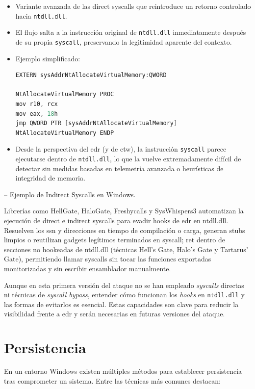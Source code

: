 \begin{itemize}
\item Variante avanzada de las direct syscalls que reintroduce un retorno controlado hacia \texttt{ntdll.dll}.
\item El flujo salta a la instrucción original de \texttt{ntdll.dll} inmediatamente después de su propia \texttt{syscall}, preservando la legitimidad aparente del contexto.
\item Ejemplo simplificado:
\begin{lstlisting}[language=C]
EXTERN sysAddrNtAllocateVirtualMemory:QWORD

NtAllocateVirtualMemory PROC
mov r10, rcx
mov eax, 18h
jmp QWORD PTR [sysAddrNtAllocateVirtualMemory]
NtAllocateVirtualMemory ENDP
\end{lstlisting}
\item Desde la perspectiva del \acrshort{edr} (y de \acrshort{etw}), la instrucción \texttt{syscall} parece ejecutarse dentro de \texttt{ntdll.dll}, lo que la vuelve extremadamente difícil de detectar sin medidas basadas en telemetría avanzada o heurísticas de integridad de memoria.
\end{itemize}

\cite{ref:indirectsyscalls} – Ejemplo de Indirect Syscalls en Windows.

Librerías como HellGate, HaloGate, Freshycalls y SysWhispers3 automatizan la ejecución de direct e indirect syscalls para evadir hooks de \acrshort{edr} en ntdll.dll. Resuelven los \acrshort{ssn} y direcciones en tiempo de compilación o carga, generan stubs limpios o reutilizan gadgets legítimos terminados en syscall; ret dentro de secciones no hookeadas de ntdll.dll (técnicas Hell’s Gate, Halo’s Gate y Tartarus’ Gate), permitiendo llamar syscalls sin tocar las funciones exportadas monitorizadas y sin escribir ensamblador manualmente.

Aunque en esta primera versión del ataque no se han empleado \textit{syscalls} directas ni técnicas de \textit{syscall bypass}, entender cómo funcionan los \textit{hooks} en \texttt{ntdll.dll} y las formas de evitarlos es esencial. Estas capacidades son clave para reducir la visibilidad frente a \acrshort{edr} y serán necesarias en futuras versiones del ataque.

\section{Persistencia} \label{sec:persistencia}

En un entorno Windows existen múltiples métodos para establecer persistencia tras comprometer un sistema. 
Entre las técnicas más comunes destacan:

